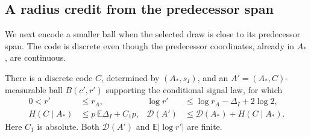 \subsection{A radius credit from the predecessor span}

We next encode a smaller ball when the selected draw is close to its
predecessor span.  The code is discrete even though the predecessor
coordinates, already in \(A_*\), are continuous.

\begin{lemma}
\label{l:span:localization}
There is a discrete code \(C\), determined by \((A_*,s_I)\), and an
\(A'=(A_*,C)\)-measurable ball \(B(c',r')\) supporting the conditional
signal law, for which
\begin{align}
 0<r'&\le r_A,&
 \log r'&\le\log r_A-\Delta_I+2\log2,
 \label{l:span:radius}\\
 H(C\mid A_*)&\le p\,\mathbb E\Delta_I+C_1p,&
 \mathcal D(A')&\le\mathcal D(A_*)+H(C\mid A_*).
 \label{l:span:code}
\end{align}
Here \(C_1\) is absolute.  Both \(\mathcal D(A')\) and
\(\mathbb E|\log r'|\) are finite.
\end{lemma}
